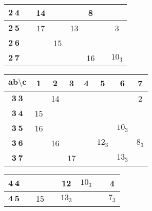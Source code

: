 \documentclass[a4paper,12pt]{report}
\begin{document}
\begin{center}
\begin{tabular}{|c||c|c|c|c|c|c|c|}
$\textbf{2}\:\textbf{4}$ &  & 14 & & & 8& & \\ \hline

$\textbf{2}\:\textbf{5}$ &  & 17 & & 13& & &3 \\ \hline

$\textbf{2}\:\textbf{6}$ &  &  & 15& & & & \\ \hline

$\textbf{2}\:\textbf{7}$ &  &  & & & 16& &$10_{3}$ \\ \hline
\end{tabular}

\begin{tabular}{|c||c|c|c|c|c|c|c|}\hline
$\textbf{ab} \setminus \textbf{c}$  & \textbf{1} & \textbf{2} & \textbf{3} & \textbf{4} & \textbf{5} & \textbf{6} & \textbf{7}\\
\hline \hline

$\textbf{3}\:\textbf{3}$ &\hspace{6mm}  & 14 &\hspace{6mm} & \hspace{6mm} & \hspace{6mm} &\hspace{6mm} & 2 \\
\hline

$\textbf{3}\:\textbf{4}$ & 15& \hspace{6mm} & &  & && \hspace{6mm} \\
\hline

$\textbf{3}\:\textbf{5}$ & 16 &  & &  & & $10_{3}$&  \\
\hline

$\textbf{3}\:\textbf{6}$ &  & 16 & &  &$12_{3}$ & & $8_{3}$ \\
\hline

$\textbf{3}\:\textbf{7}$ &  &  & 17&  & & $13_{3}$&  \\ \hline
\end{tabular}

\begin{tabular}{|c||c|c|c|c|c|c|c|}\hline
\hspace{1.5mm} $\textbf{4}\:\textbf{4}$ \hspace{1mm} & \hspace{6mm} & \hspace{6mm} & \hspace{6mm} & 12& $10_{3}$&
\hspace{6mm} &4
\\ \hline

$\textbf{4}\:\textbf{5}$ &  & 15& & $13_{3}$& \hspace{6mm} & &$7_{3}$ \\ \hline


\end{tabular}
\end{center}
\end{document}

